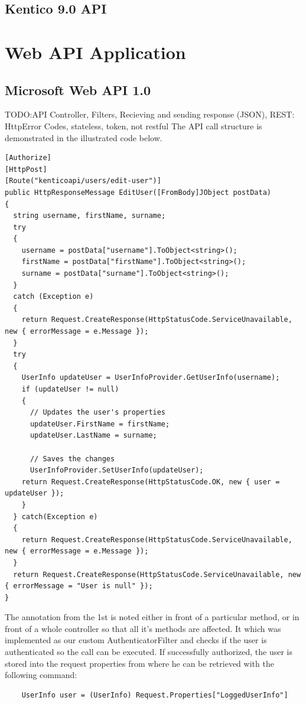 \subsection{Kentico 9.0 API}

\section{Web API Application}
\subsection{Microsoft Web API 1.0}
TODO:API Controller, Filters, Recieving and sending response (JSON), REST: HttpError Codes, stateless, token, not restful
The API call structure is demonstrated in the illustrated code below. 
\lstset{style=sharpc, numbers=left}
\begin{lstlisting}
[Authorize]
[HttpPost]
[Route("kenticoapi/users/edit-user")]
public HttpResponseMessage EditUser([FromBody]JObject postData)
{
  string username, firstName, surname;
  try
  {
    username = postData["username"].ToObject<string>();
    firstName = postData["firstName"].ToObject<string>(); 
    surname = postData["surname"].ToObject<string>();
  }
  catch (Exception e)
  {
    return Request.CreateResponse(HttpStatusCode.ServiceUnavailable, new { errorMessage = e.Message });
  }
  try
  {
    UserInfo updateUser = UserInfoProvider.GetUserInfo(username);
    if (updateUser != null)
    {
      // Updates the user's properties
      updateUser.FirstName = firstName;
      updateUser.LastName = surname;

      // Saves the changes
      UserInfoProvider.SetUserInfo(updateUser);
    return Request.CreateResponse(HttpStatusCode.OK, new { user = updateUser });
    }
  } catch(Exception e)
  {
    return Request.CreateResponse(HttpStatusCode.ServiceUnavailable, new { errorMessage = e.Message });
  }
  return Request.CreateResponse(HttpStatusCode.ServiceUnavailable, new { errorMessage = "User is null" });
}
\end{lstlisting}
The annotation from the 1st is noted either in front of a particular method, or in front of a whole controller so that all it's methods are affected. It which was implemented as our custom AuthenticatorFilter and checks if the user is authenticated so the call can be executed. If successfully authorized, the user is stored into the request properties from where he can be retrieved with the following command:
\lstset{style=sharpc, numbers = none}
\begin{lstlisting}
	UserInfo user = (UserInfo) Request.Properties["LoggedUserInfo"]
\end{lstlisting}
